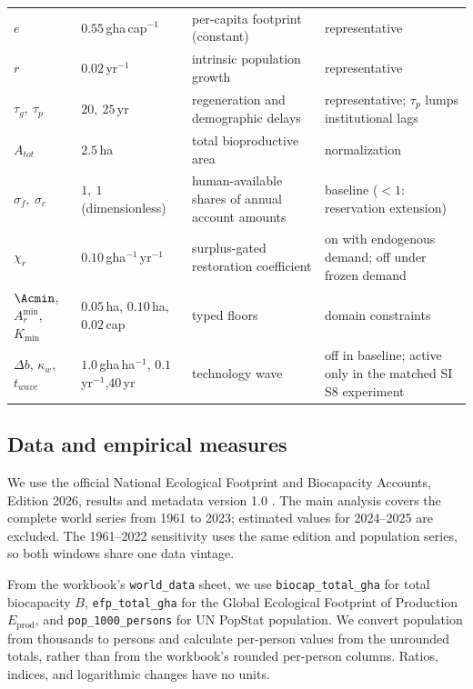 \begin{table}[!htbp]
\begin{tabularx}{\textwidth}{@{}>{\raggedright\arraybackslash}p{} >{\raggedright\arraybackslash}p{} >{\raggedright\arraybackslash}X >{\raggedright\arraybackslash}p{}@{}}
$e$ & $0.55$\,gha\,cap$^{-1}$ & per-capita footprint (constant) & representative \\
$r$ & $0.02$\,yr$^{-1}$ & intrinsic population growth & representative \\
$\tau_g,\ \tau_p$ & $20,\ 25$\,yr & regeneration and demographic delays & representative; $\tau_p$ lumps institutional lags \\
$A_{tot}$ & $2.5$\,ha & total bioproductive area & normalization \\
$\sigma_f,\ \sigma_c$ & $1,\ 1$ (dimensionless) & human-available shares of annual account amounts & baseline ($<1$: reservation extension) \\
$\chi_r$ & $0.10$\,gha$^{-1}$\,yr$^{-1}$ & surplus-gated restoration coefficient & on with endogenous demand; off under frozen demand \\
$\Acmin$, $A_r^{\min}$,\newline $K_{\min}$ & $0.05$\,ha, $0.10$\,ha,\newline $0.02$\,cap & typed floors & domain constraints \\
$\Delta b$, $\kappa_w$,\newline $t_{wave}$ & $1.0$\,gha\,ha$^{-1}$, $0.1$\,yr$^{-1}$,\newline $40$\,yr & technology wave & off in baseline; active only in the matched SI S8 experiment \\
\bottomrule
\end{tabularx}
\end{table}

\subsection{Data and empirical measures}\label{sec:data}

We use the official National Ecological Footprint and Biocapacity Accounts, Edition 2026, results and metadata version 1.0 \citep{Lo2026NFA}. The main analysis covers the complete world series from 1961 to 2023; estimated values for 2024--2025 are excluded. The 1961--2022 sensitivity uses the same edition and population series, so both windows share one data vintage.

From the workbook's \texttt{world\_data} sheet, we use \texttt{biocap\_total\_gha} for total biocapacity $B$, \texttt{efp\_total\_gha} for the Global Ecological Footprint of Production $E_{\mathrm{prod}}$, and \texttt{pop\_1000\_persons} for UN PopStat population. We convert population from thousands to persons and calculate per-person values from the unrounded totals, rather than from the workbook's rounded per-person columns. Ratios, indices, and logarithmic changes have no units.

